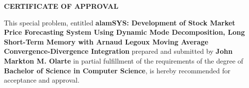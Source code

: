 \begin{titlepage}
    \centering
    \textbf{CERTIFICATE OF APPROVAL}

    \begin{justify}
        \qquad This special problem, entitled \textbf{alamSYS: Development of Stock Market Price Forecasting System Using Dynamic Mode Decomposition, Long Short-Term Memory with Arnaud Legoux Moving Average Convergence-Divergence Integration}
        prepared and submitted by \textbf{John Markton M. Olarte} in partial fulfillment of the requirements of the degree
        of \textbf{Bachelor of Science in Computer Science}, is hereby recommended for acceptance and approval.
    \end{justify}
    \hfill


    \begin{table}[h!]
    \end{table}
    \hfill

    \begin{table}[h!]
        \end{table}
        \hfill
    


\end{titlepage}

